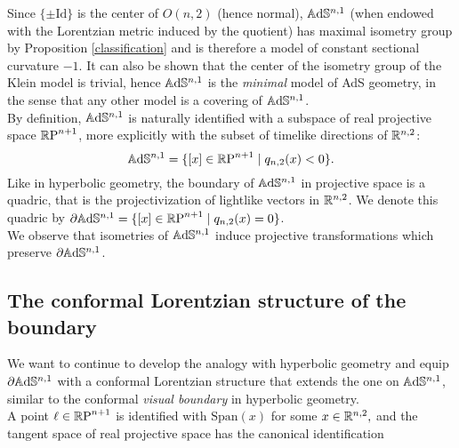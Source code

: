 Since $\{\pm \text{Id}\}$ is the center of $O(n,2)$ (hence normal), $\mathbb{A}\mathrm{d}\mathbb{S}^{n,1}$ (when endowed with the Lorentzian metric induced by the quotient) has maximal isometry group by Proposition \ref{classification} and is therefore a model of constant sectional curvature $-1$. It can also be shown that the center of the isometry group of the Klein model is trivial, hence $\mathbb{A}\mathrm{d}\mathbb{S}^{n,1}$ is the \textit{minimal} model of AdS geometry, in the sense that any other model is a covering of $\mathbb{A}\mathrm{d}\mathbb{S}^{n,1}$.\\
By definition, $\mathbb{A}\mathrm{d}\mathbb{S}^{n,1}$ is naturally identified with a subspace of real projective space $\mathbb{R} \text{P}^{n+1}$, more explicitly with the subset of timelike directions of $\mathbb{R}^{n,2}$: 
\[
    \mathbb{A}\mathrm{d}\mathbb{S}^{n,1}=\{[x]\in \mathbb{R} \text{P}^{n+1}\;|\;q_{n,2}(x)<0\}.
\]
Like in hyperbolic geometry, the boundary of $\mathbb{A}\mathrm{d}\mathbb{S}^{n,1}$ in projective space is a quadric, that is the projectivization of lightlike vectors in $\mathbb{R}^{n,2}$. We denote this quadric by $\partial \mathbb{A}\mathrm{d}\mathbb{S}^{n,1}=\{[x]\in \mathbb{R} \text{P}^{n+1}\;|\;q_{n,2}(x)=0\}$.\\ We observe that isometries of $\mathbb{A}\mathrm{d}\mathbb{S}^{n,1}$ induce projective transformations which preserve $\partial \mathbb{A}\mathrm{d}\mathbb{S}^{n,1}$.  \\

\subsection{The conformal Lorentzian structure of the boundary}
We want to continue to develop the analogy with hyperbolic geometry and equip $\partial \mathbb{A}\mathrm{d}\mathbb{S}^{n,1}$ with a conformal Lorentzian structure that extends the one on $\mathbb{A}\mathrm{d}\mathbb{S}^{n,1}$, similar to the conformal \textit{visual boundary} in hyperbolic geometry. \\
A point $\ell \in\mathbb{R}\text{P}^{n+1}$ is identified with $\text{Span}(x)$ for some $x\in \mathbb{R}^{n,2},$ and the tangent space of real projective space has the canonical identification 


